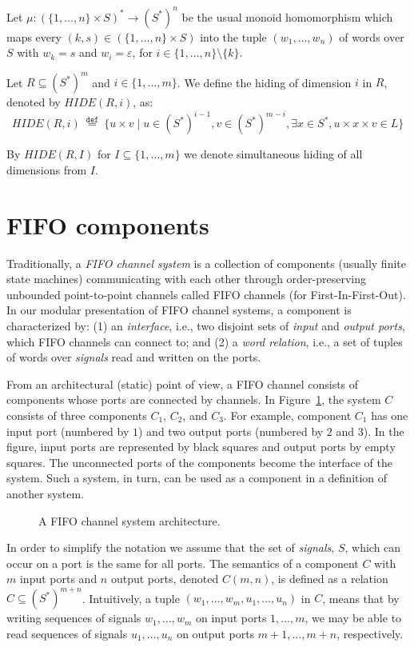 \documentclass{llncs}
\newcommand{\df}[1]{\ \stackrel{\mathtt{def}}{#1}\ }
\begin{document}
Let $\mu:(\{1,\ldots,n\}\times S)^{\ast}\rightarrow (S^\ast)^{n}$ be
the usual monoid homomorphism which maps every
$(k,s)\in(\{1,\ldots,n\}\times S)$ into the tuple $(w_1,\ldots,w_n)$
of words over $S$ with $w_k=s$ and $w_i=\varepsilon$, for
$i\in\{1,\ldots,n\}\setminus\{k\}$.

Let $R\subseteq (S^{\ast})^m$ and $i\in\{1,\ldots,m\}$. We define the
hiding of dimension $i$ in $R$, denoted by $\mathit{HIDE}(R,i)$, as:
  \[
  \mathit{HIDE}(R,i)\df{=}\{u\times v \mid
  u\in(S^{\ast})^{i-1}, v\in(S^{\ast})^{m-i}, \exists x\in S^\ast,
  u\times x \times v \in L\}
\]

By $\mathit{HIDE}(R,I)$ for $I\subseteq\{1,\ldots,m\}$ we denote
simultaneous hiding of all dimensions from $I$.



\section{FIFO components}


Traditionally, a \emph{FIFO channel system} is a collection of
components (usually finite state machines) communicating with each other
through order-preserving unbounded point-to-point channels called FIFO
channels (for First-In-First-Out). In our modular presentation of FIFO
channel systems, a component is characterized by: (1) an
\emph{interface}, i.e., two disjoint sets of \emph{input} and
\emph{output ports}, which FIFO channels can connect to; and (2) a
\emph{word relation}, i.e., a set of tuples of words over
\emph{signals} read and written on the ports.

From an architectural (static) point of view, a FIFO channel consists
of components whose ports are connected by channels. In
Figure~\ref{fig:fifo-system}, the system $C$ consists of three
components $C_1$, $C_2$, and $C_3$. For example, component $C_1$ has
one input port (numbered by $1$) and two output ports (numbered by $2$
and $3$). In the figure, input ports are represented by black
squares and output ports by empty squares. The unconnected ports of
the components become the interface of the system. Such a system, in
turn, can be used as a component in a definition of another system.
\begin{figure}[htb]
  \centering
  
  \caption{A FIFO channel system architecture.}
  \label{fig:fifo-system}
\end{figure}


In order to simplify the notation we assume that the set of
\emph{signals}, $S$, which can occur on a port is the same for all
ports. The semantics of a component $C$ with $m$ input ports and $n$
output ports, denoted $C(m,n)$, is defined as a relation $C \subseteq
(S^\ast)^{m+n}$. Intuitively, a tuple
$(w_1,\ldots,w_m,u_1,\ldots,u_n)$ in $C$, means that by writing
sequences of signals $w_1,\ldots,w_m$ on input ports $1,\ldots,m$, we
may be able to read sequences of signals $u_1,\ldots,u_n$ on output
ports $m+1,\ldots,m+n$, respectively.
\end{document}
